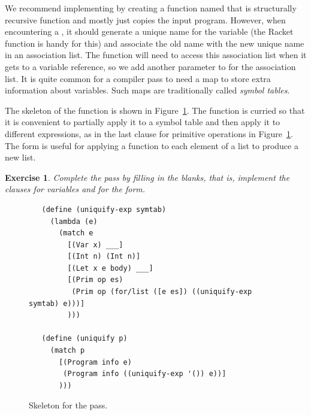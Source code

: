 \documentclass[11pt]{book}
\newtheorem{exercise}[theorem]{Exercise}
\begin{document}
We recommend implementing  by creating a function named
 that is structurally recursive function and mostly
just copies the input program. However, when encountering a ,
it should generate a unique name for the variable (the Racket function
 is handy for this) and associate the old name with the
new unique name in an association list. The 
function will need to access this association list when it gets to a
variable reference, so we add another parameter to 
for the association list. It is quite common for a compiler pass to
need a map to store extra information about variables. Such maps are
traditionally called \emph{symbol tables}.

The skeleton of the  function is shown in
Figure~\ref{fig:uniquify-s0}.  The function is curried so that it is
convenient to partially apply it to a symbol table and then apply it
to different expressions, as in the last clause for primitive
operations in Figure~\ref{fig:uniquify-s0}.  The  form
is useful for applying a function to each element of a list to produce
a new list.


\begin{exercise}
\normalfont %

Complete the  pass by filling in the blanks, that is,
implement the clauses for variables and for the  form.
\end{exercise}

\begin{figure}[tbp]
\begin{lstlisting}
   (define (uniquify-exp symtab)
     (lambda (e)
       (match e
         [(Var x) ___]
         [(Int n) (Int n)]
         [(Let x e body) ___]
         [(Prim op es)
          (Prim op (for/list ([e es]) ((uniquify-exp symtab) e)))]
         )))

   (define (uniquify p)
     (match p
       [(Program info e)
        (Program info ((uniquify-exp '()) e))]
       )))
\end{lstlisting}
\caption{Skeleton for the  pass.}
\label{fig:uniquify-s0}
\end{figure}
\end{document}
